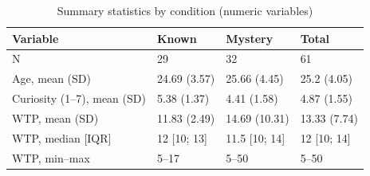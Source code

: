 \begin{table}

\caption{\label{tab:tab:summary_numeric}Summary statistics by condition (numeric variables)}
\centering
\begin{tabular}[t]{llll}
\toprule
Variable & Known & Mystery & Total\\
\midrule
N & 29 & 32 & 61\\
Age, mean (SD) & 24.69 (3.57) & 25.66 (4.45) & 25.2 (4.05)\\
Curiosity (1--7), mean (SD) & 5.38 (1.37) & 4.41 (1.58) & 4.87 (1.55)\\
WTP, mean (SD) & 11.83 (2.49) & 14.69 (10.31) & 13.33 (7.74)\\
WTP, median [IQR] & 12 [10; 13] & 11.5 [10; 14] & 12 [10; 14]\\
\addlinespace
WTP, min--max & 5--17 & 5--50 & 5--50\\
\bottomrule
\end{tabular}
\end{table}
